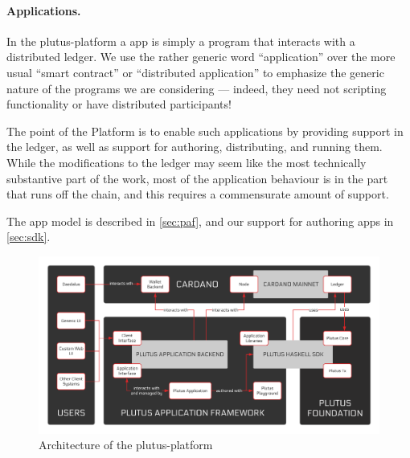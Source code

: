 \paragraph{Applications.}
In the \gls{plutus-platform} a \gls{app} is simply a program that interacts with a distributed ledger.
We use the rather generic word ``application'' over the more usual ``smart contract'' or ``distributed application'' to emphasize the generic nature of the programs we are considering --- indeed, they need not scripting functionality or have distributed participants!

The point of the Platform is to enable such applications by providing support in the ledger, as well as support for authoring, distributing, and running them.
While the modifications to the ledger may seem like the most technically substantive part of the work, most of the application behaviour is in the part that runs off the chain, and this requires a commensurate amount of support.

The \gls{app} model is described in \cref{sec:paf}, and our support for authoring \glspl{app} in \cref{sec:sdk}.

\begin{figure}[t]
  \centering
  \includegraphics[width=\textwidth]{platform-architecture.png}
  \caption{Architecture of the \gls{plutus-platform}}
  \label{fig:platform-architecture}
\end{figure}

